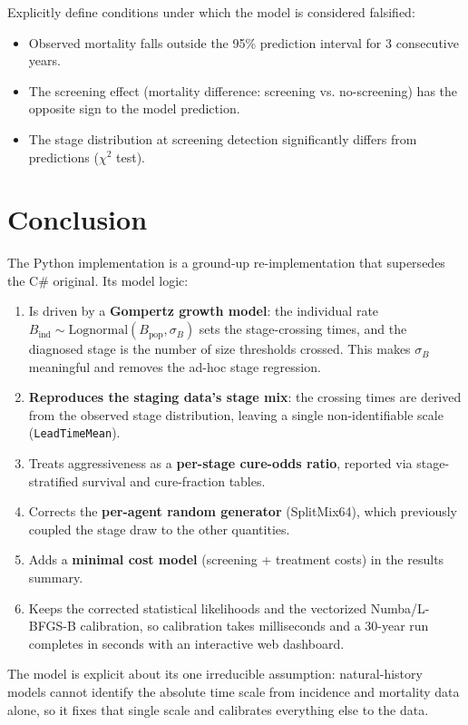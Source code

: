 \documentclass[12pt,a4paper]{article}
\begin{document}
Explicitly define conditions under which the model is considered falsified:
\begin{itemize}[nosep]
    \item Observed mortality falls outside the 95\% prediction interval for 3 consecutive years.
    \item The screening effect (mortality difference: screening vs. no-screening) has the opposite sign to the model prediction.
    \item The stage distribution at screening detection significantly differs from predictions ($\chi^2$ test).
\end{itemize}

\section{Conclusion}

The Python implementation is a ground-up re-implementation that supersedes the C\# original. Its model logic:

\begin{enumerate}[nosep]
    \item Is driven by a \textbf{Gompertz growth model}: the individual rate $B_{\text{ind}} \sim \mathrm{Lognormal}(B_{\text{pop}}, \sigma_B)$ sets the stage-crossing times, and the diagnosed stage is the number of size thresholds crossed. This makes $\sigma_B$ meaningful and removes the ad-hoc stage regression.
    \item \textbf{Reproduces the staging data's stage mix}: the crossing times are derived from the observed stage distribution, leaving a single non-identifiable scale (\texttt{LeadTimeMean}).
    \item Treats aggressiveness as a \textbf{per-stage cure-odds ratio}, reported via stage-stratified survival and cure-fraction tables.
    \item Corrects the \textbf{per-agent random generator} (SplitMix64), which previously coupled the stage draw to the other quantities.
    \item Adds a \textbf{minimal cost model} (screening + treatment costs) in the results summary.
    \item Keeps the corrected statistical likelihoods and the vectorized Numba/L-BFGS-B calibration, so calibration takes milliseconds and a 30-year run completes in seconds with an interactive web dashboard.
\end{enumerate}

The model is explicit about its one irreducible assumption: natural-history models cannot identify the absolute time scale from incidence and mortality data alone, so it fixes that single scale and calibrates everything else to the data.
\end{document}
